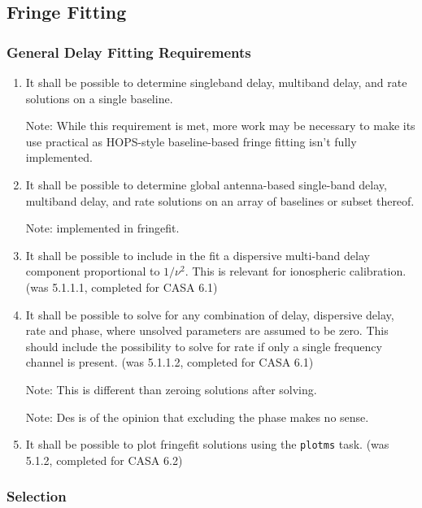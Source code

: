 \documentclass[11pt,a4paper]{article}
\begin{document}
\subsection{Fringe Fitting}

\subsubsection{General Delay Fitting Requirements}

\begin{enumerate}[subsubseclist]

\item It shall be possible to determine singleband delay, multiband
  delay, and rate solutions on a single baseline.

  Note: While this requirement is met, more work may be necessary to
  make its use practical as HOPS-style baseline-based fringe fitting
  isn't fully implemented.

\item It shall be possible to determine global antenna-based
  single-band delay, multiband delay, and rate solutions on an array
  of baselines or subset thereof.

  Note: implemented in fringefit.

\item It shall be possible to include in the fit a dispersive
  multi-band delay component proportional to $1/\nu^2$. This is
  relevant for ionospheric calibration.  (was 5.1.1.1, completed for CASA 6.1)

\item It shall be possible to solve for any combination of delay,
  dispersive delay, rate and phase, where unsolved parameters are
  assumed to be zero.  This should include the possibility to solve
  for rate if only a single frequency channel is present.  (was
  5.1.1.2, completed for CASA 6.1)

  Note: This is different than zeroing solutions after solving.
  
  Note: Des is of the opinion that excluding the phase makes no sense.

\item It shall be possible to plot fringefit solutions using the
  \texttt{plotms} task.  (was 5.1.2, completed for CASA 6.2)

\end{enumerate}

\subsubsection{Selection}
\end{document}
